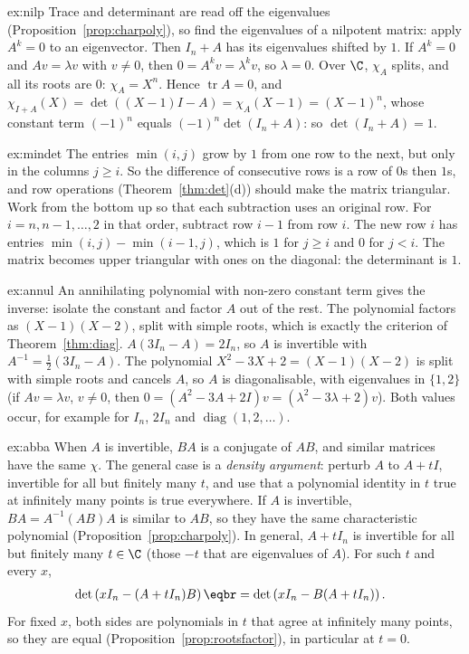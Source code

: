\begin{solution}{ex:nilp}
\idea Trace and determinant are read off the eigenvalues (Proposition~\ref{prop:charpoly}), so find the eigenvalues of a nilpotent matrix: apply $A^k=0$ to an eigenvector. Then $I_n+A$ has its eigenvalues shifted by $1$.
\writeup If $A^k=0$ and $Av=\lambda v$ with $v\ne0$, then $0=A^kv=\lambda^kv$, so $\lambda=0$. Over $\C$, $\chi_A$ splits, and all its roots are $0$: $\chi_A=X^n$. Hence
$\operatorname{tr}A=0$, and $\chi_{I+A}(X)=\det((X-1)I-A)=\chi_A(X-1)=(X-1)^n$, whose constant term $(-1)^n$ equals $(-1)^n\det(I_n+A)$: so $\det(I_n+A)=1$.
\end{solution}

\begin{solution}{ex:mindet}
\idea The entries $\min(i,j)$ grow by $1$ from one row to the next, but only in the columns $j\ge i$. So the difference of consecutive rows is a row of $0$s then $1$s, and row operations (Theorem~\ref{thm:det}(d)) should make the matrix triangular. Work from the bottom up so that each subtraction uses an original row.
\writeup For $i=n,n-1,\dots,2$ in that order, subtract row $i-1$ from row $i$. The new row $i$ has entries $\min(i,j)-\min(i-1,j)$, which is $1$ for $j\ge i$ and $0$ for $j<i$.
The matrix becomes upper triangular with ones on the diagonal: the determinant is $1$.
\end{solution}

\begin{solution}{ex:annul}
\idea An annihilating polynomial with non-zero constant term gives the inverse: isolate the constant and factor $A$ out of the rest. The polynomial factors as $(X-1)(X-2)$, split with simple roots, which is exactly the criterion of Theorem~\ref{thm:diag}.
\writeup $A(3I_n-A)=2I_n$, so $A$ is invertible with $A^{-1}=\frac12(3I_n-A)$. The polynomial $X^2-3X+2=(X-1)(X-2)$ is split with simple roots and cancels $A$,
so $A$ is diagonalisable, with eigenvalues in $\{1,2\}$ (if $Av=\lambda v$, $v\ne0$, then $0=(A^2-3A+2I)v=(\lambda^2-3\lambda+2)v$). Both values occur, for example for $I_n$, $2I_n$ and $\operatorname{diag}(1,2,\dots)$.
\end{solution}

\begin{solution}{ex:abba}
\idea When $A$ is invertible, $BA$ is a conjugate of $AB$, and similar matrices have the same $\chi$. The general case is a \emph{density argument}: perturb $A$ to $A+tI$, invertible for all but finitely many $t$, and use that a polynomial identity in $t$ true at infinitely many points is true everywhere.
\writeup If $A$ is invertible, $BA=A^{-1}(AB)A$ is similar to $AB$, so they have the same characteristic polynomial (Proposition~\ref{prop:charpoly}). In general, $A+tI_n$ is invertible for all but finitely many $t\in\C$
(those $-t$ that are eigenvalues of $A$). For such $t$ and every $x$,
\[
\begin{aligned}&\det\left(xI_n-(A+tI_n)B\right)\eqbr=\det\left(xI_n-B(A+tI_n)\right).\end{aligned}
\]
For fixed $x$, both sides are polynomials in $t$ that agree at infinitely many points, so they are equal (Proposition~\ref{prop:rootsfactor}), in particular at $t=0$.
\end{solution}

